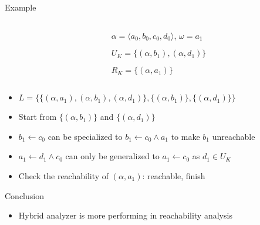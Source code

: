 \documentclass[8pt]{beamer}
\begin{document}
\begin{frame}{Example}
\begin{columns}
\begin{column}{0.6\textwidth}

\end{column}
\begin{column}{0.4\textwidth}
    $\alpha=\langle a_0,b_0,c_0,d_0\rangle$, $\omega=a_1$
    
	$U_K=\{(\alpha,b_1),(\alpha,d_1)\}$
	
	$R_K=\{(\alpha,a_1)\}$
\end{column}
\end{columns}




	
        \vspace{0.5cm}
        \centering
        
        
        \vspace{0.5cm}
    
     \begin{itemize}
        \item $L=\{\{(\alpha,a_1),(\alpha,b_1),(\alpha,d_1)\},\{(\alpha,b_1)\},\{(\alpha,d_1)\}\}$
        \item Start from $\{(\alpha,b_1)\}$ and $\{(\alpha,d_1)\}$
        \item $b_1\gets c_0$ can be specialized to $b_1\gets c_0\land a_1$ to make $b_1$ unreachable
        \item $a_1\gets d_1 \land c_0$ can only be generalized to $a_1 \gets c_0$ as $d_1\in U_K$
        \item Check the reachability of $(\alpha,a_1)$: reachable, finish
    \end{itemize}
\end{frame}

\begin{frame}{Conclusion}
\begin{itemize}
    \item Hybrid analyzer is more performing in reachability analysis
\end{itemize}

\end{frame}

%    
%    
\end{document}
